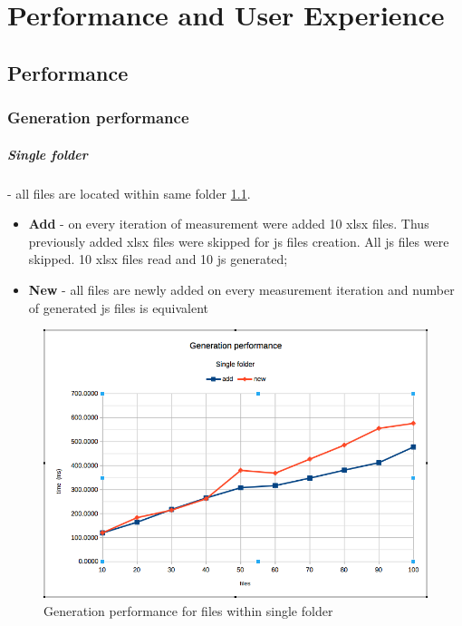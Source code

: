 \chapter{Performance and User Experience}
\label{chap:perfux}

\section{Performance}

\subsection{Generation performance}
\paragraph{Single folder} - all files are located within same folder \ref{fig:gs}.
\begin{itemize}
	\item \textbf{Add} - on every iteration of measurement were added 10 xlsx files. Thus previously added xlsx files were skipped for js files creation. All js files were skipped. 10 xlsx files read and 10 js generated;
	\item \textbf{New} - all files are newly added on every measurement iteration and number of generated js files is equivalent
\end{itemize}


\begin{figure}[ht]
	\label{fig:gs}
	\centering
	\includegraphics[width=\textwidth]{grafiken/generation_single}
	\caption{Generation performance for files within single folder}
\end{figure}

